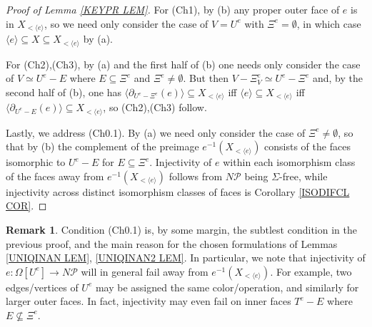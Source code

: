 \documentclass[a4paper,10pt
,draft
]{article}%
\numberwithin{equation}{section}
\numberwithin{figure}{section}
\theoremstyle{definition} %
\newtheorem{remark}[equation]{Remark}%
\newcommand{\1}{\ensuremath{\mathbbm 1}}%
\begin{document}
\begin{proof}[Proof of Lemma \ref{KEYPR LEM}]
	For (Ch1), by (b) any proper outer face of $e$ is in $X_{<\langle e\rangle}$, so we need only consider the case of
	$V=U^e$ with $\Xi^e=\emptyset$, in which case
	$\langle e \rangle \subseteq X \subseteq X_{<\langle e\rangle}$ by (a).
	
	For (Ch2),(Ch3), by (a) and the first half of (b) one needs only consider the case of
	$V \simeq U^e - E$ where $E \subseteq \Xi^e$ and $\Xi^e \neq \emptyset$.
	But then
	$V - \Xi^e_V \simeq U^e- \Xi^e$
	and, by the second half of (b),
	one has
	$\langle \partial_{U^e-\Xi^e}(e) \rangle \subseteq  X_{<\langle e\rangle}$
	iff
	$\langle e \rangle \subseteq  X_{<\langle e\rangle}$
	iff
	$\langle \partial_{U^e-E}(e) \rangle \subseteq  X_{<\langle e\rangle}$,
	so (Ch2),(Ch3) follow.
	
	
	Lastly, we address (Ch0.1). By (a) we need only consider the case of $\Xi^e \neq \emptyset$,
	so that by (b)
	the complement of
	the preimage
	$e^{-1}(X_{<\langle e\rangle})$
	consists of the faces isomorphic to
	$U^e-E$ for $E \subseteq \Xi^e$.
	Injectivity of $e$ within each isomorphism class of the faces away from %
	$e^{-1}(X_{<\langle e\rangle})$
	follows from $N \mathcal{P}$ being $\Sigma$-free,
	while injectivity across distinct isomorphism classes of faces is
	Corollary \ref{ISODIFCL COR}.
\end{proof}



\begin{remark}\label{CH01SUCKS REM}
	Condition (Ch0.1) is, by some margin, the subtlest condition in the previous proof, and the main reason for the chosen formulations of 
	Lemmas \ref{UNIQINAN LEM}, \ref{UNIQINAN2 LEM}.
	In particular, we note that injectivity of 
	$e \colon \Omega[U^e] \to N \mathcal{P}$ will in general fail away from 
	$e^{-1}(X_{< \langle e \rangle})$.
	For example, two edges/vertices of $U^e$
	may be assigned the same color/operation, and similarly for larger outer faces. In fact, injectivity may even fail on inner faces
	$T^e-E$ where $E \not \subseteq \Xi^e$.
\end{remark}
\end{document}
